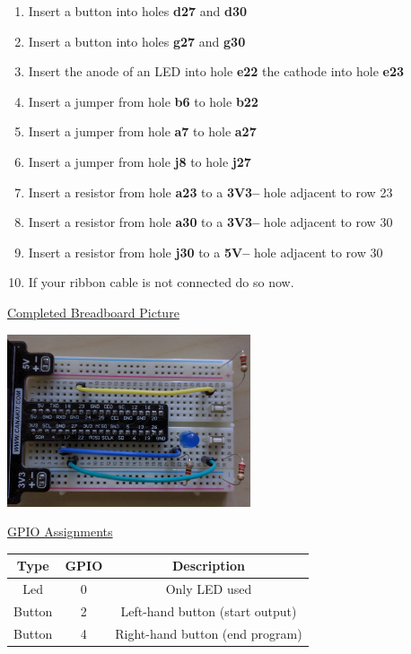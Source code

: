 \begin{enumerate}
	\item Insert a button into holes \textbf{d27} and \textbf{d30}
	\item Insert a button into holes \textbf{g27} and \textbf{g30}

    
    \item Insert the anode of an LED into hole \textbf{e22} the cathode into hole \textbf{e23}
            
    \item Insert a jumper from hole \textbf{b6} to hole \textbf{b22}
    \item Insert a jumper from hole \textbf{a7} to hole \textbf{a27}
    \item Insert a jumper from hole \textbf{j8} to hole \textbf{j27}
    
    \item Insert a resistor from hole \textbf{a23} to a \textbf{3V3--} hole adjacent to row 23    
    \item Insert a resistor from hole \textbf{a30} to a \textbf{3V3--} hole adjacent to row 30
    \item Insert a resistor from hole \textbf{j30} to a \textbf{5V--} hole adjacent to row 30
        
    \item If your ribbon cable is not connected do so now.
\end{enumerate}

\underline{Completed Breadboard Picture}

\beforefig
\centerline{\includegraphics[height=2in]{pi_images/lab03images/PiLab03-ButtonLightPhoto.jpg}}
\afterfig

\underline{GPIO Assignments}

\begin{center}
	\begin{tabular}{c | c | c}
		\hline
		\textbf{Type} & \textbf{GPIO} & \textbf{Description} \\ \hline
		Led & 0 & Only LED used \\ 
		\hline
		Button & 2 & Left-hand button (start output) \\ 
		\hline
		Button & 4 & Right-hand button (end program) \\ 
		\hline	
	\end{tabular}
\end{center}

